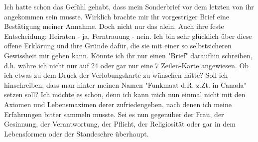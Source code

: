 \def\day{15. Januar 1943}
\mktitle

Ich hatte schon das Gef\"{u}hl gehabt, dass mein Sonderbrief vor dem letzten von ihr angekommen sein musste.
Wirklich brachte mir ihr vorgestriger Brief eine Best\"{a}tigung meiner Annahme.
Doch nicht nur das alein.
Auch ihre feste Entscheidung: Heiraten - ja, Ferntrauung - nein.
Ich bin sehr gl\"{u}cklich \"{u}ber diese offene Erkl\"{a}rung und ihre Gr\"{u}nde daf\"{u}r, die sie mit einer so selbstsicheren Gewissheit mir geben kann.
K\"{o}nnte ich ihr nur einen "Brief" daraufhin schreiben, d.h. w\"{a}hre ich nicht nur auf 24 oder gar nur eine 7 Zeilen-Karte angewiesen.
Ob ich etwas zu dem Druck der Verlobungskarte zu w\"{u}nschen h\"{a}tte?
Soll ich hinschreiben, dass man hinter meinen Namen "Funkmaat d.R. z.Zt. in Canada" setzen soll?
Ich m\"{o}chte es schon, denn ich kann mich nun einmal nicht mit den Axiomen und Lebensmaximen derer zufriedengeben, nach denen ich meine Erfahrungen bitter sammeln musste.
Sei es nun gegen\"{u}ber der Frau, der Gesinnung, der Verantwortung, der Pflicht, der Religiosit\"{a}t oder gar in dem Lebensformen oder der Standesehre \"{u}berhaupt.

\clearpage
